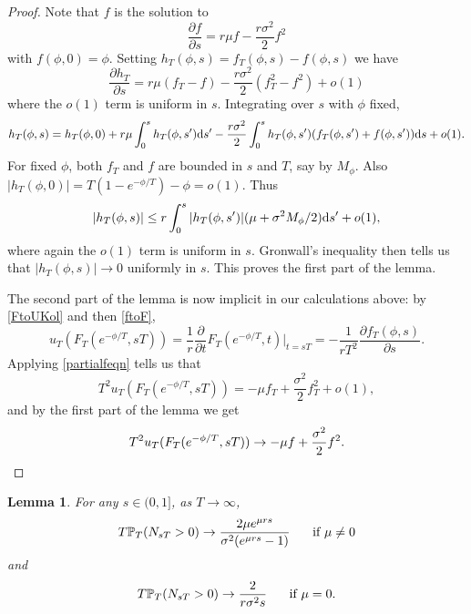 \documentclass{article}
\theoremstyle{plain}
\newtheorem{lem}[thm]{Lemma}
\theoremstyle{definition}
\renewcommand{\P}{\mathbb{P}}
\renewcommand{\d}{{\rm{d}}}
\begin{document}
\begin{proof}
Note that $f$ is the solution to
\[\frac{\partial f}{\partial s} = r\mu f - \frac{r\sigma^2}{2} f^2\]
with $f(\phi,0) = \phi$. Setting $h_T(\phi,s) = f_T(\phi,s)-f(\phi,s)$ we have
\[\frac{\partial h_T}{\partial s} = r\mu (f_T - f) - \frac{r\sigma^2}{2} (f_T^2-f^2) + o(1)\]
where the $o(1)$ term is uniform in $s$. Integrating over $s$ with $\phi$ fixed,
\[h_T(\phi,s) = h_T(\phi,0) + r\mu\int_0^s h_T(\phi,s')\d s' - \frac{r\sigma^2}{2}\int_0^s h_T(\phi,s')(f_T(\phi,s')+f(\phi,s'))\d s + o(1).\]
For fixed $\phi$, both $f_T$ and $f$ are bounded in $s$ and $T$, say by $M_\phi$. Also $|h_T(\phi,0)| = T(1-e^{-\phi/T}) - \phi = o(1)$. Thus
\[|h_T(\phi,s)| \le r\int_0^s |h_T(\phi,s')|(\mu + \sigma^2 M_\phi/2) \d s' + o(1),\]
where again the $o(1)$ term is uniform in $s$. Gronwall's inequality then tells us that $|h_T(\phi,s)| \to 0$ uniformly in $s$. This proves the first part of the lemma.

The second part of the lemma is now implicit in our calculations above: by \eqref{FtoUKol} and then \eqref{ftoF},
\[u_T(F_T(e^{-\phi/T},sT)) = \frac{1}{r}\frac{\partial}{\partial t} F_T(e^{-\phi/T},t) |_{t=sT} = -\frac{1}{rT^2} \frac{\partial f_T(\phi,s)}{\partial s}.\]
Applying \eqref{partialfeqn} tells us that
\[T^2 u_T(F_T(e^{-\phi/T},sT)) = - \mu f_T + \frac{\sigma^2}{2} f_T^2 + o(1),\]
and by the first part of the lemma we get
\[T^2 u_T(F_T(e^{-\phi/T},sT)) \to -\mu f + \frac{\sigma^2}{2} f^2.\qedhere\]
\end{proof}

\begin{lem}\label{scaledPext}
For any $s\in(0,1]$, as $T\to\infty$,
\[T\P_T(N_{sT}>0) \to \frac{2\mu e^{\mu r s}}{\sigma^2(e^{\mu r s}-1)}\hspace{5mm} \hbox{ if } \mu\neq 0\]
and
\[T\P_T(N_{sT}>0) \to \frac{2}{r\sigma^2 s}\hspace{5mm} \hbox{ if } \mu = 0.\]
\end{lem}
\end{document}
